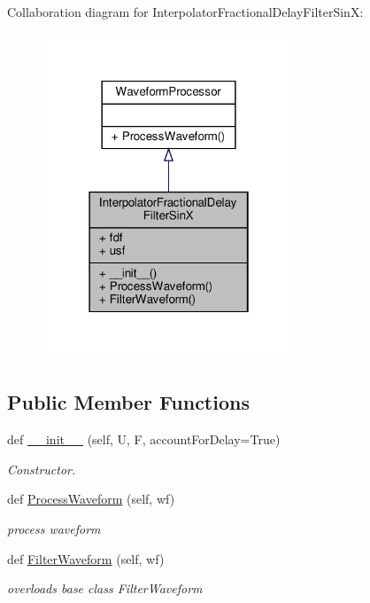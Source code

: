 Collaboration diagram for Interpolator\+Fractional\+Delay\+Filter\+SinX\+:\nopagebreak
\begin{figure}[H]
\begin{center}
\leavevmode
\includegraphics[width=214pt]{classSignalIntegrity_1_1TimeDomain_1_1Filters_1_1InterpolatorSinX_1_1InterpolatorFractionalDelayFilterSinX__coll__graph}
\end{center}
\end{figure}
\subsection*{Public Member Functions}
\begin{DoxyCompactItemize}
\item 
def \hyperlink{classSignalIntegrity_1_1TimeDomain_1_1Filters_1_1InterpolatorSinX_1_1InterpolatorFractionalDelayFilterSinX_a81150f52975e0ef244e215c5faf0291e}{\+\_\+\+\_\+init\+\_\+\+\_\+} (self, U, F, account\+For\+Delay=True)
\begin{DoxyCompactList}\small\item\em Constructor. \end{DoxyCompactList}\item 
def \hyperlink{classSignalIntegrity_1_1TimeDomain_1_1Filters_1_1InterpolatorSinX_1_1InterpolatorFractionalDelayFilterSinX_ae09bec195c9cb1d5819e73b7be169b11}{Process\+Waveform} (self, wf)
\begin{DoxyCompactList}\small\item\em process waveform \end{DoxyCompactList}\item 
def \hyperlink{classSignalIntegrity_1_1TimeDomain_1_1Filters_1_1InterpolatorSinX_1_1InterpolatorFractionalDelayFilterSinX_a84e73c18250ca4a61482f94ad61e735b}{Filter\+Waveform} (self, wf)
\begin{DoxyCompactList}\small\item\em overloads base class Filter\+Waveform \end{DoxyCompactList}\end{DoxyCompactItemize}


